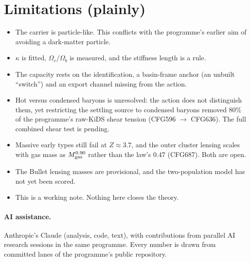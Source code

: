 \documentclass[10pt]{article}
\begin{document}
\section{Limitations (plainly)}
\begin{itemize}
\item The carrier is particle-like. This conflicts with the programme's earlier aim of avoiding a dark-matter particle.
\item $\kappa$ is fitted, $\Omega_c/\Omega_b$ is measured, and the stiffness length is a rule.
\item The capacity rests on the identification, a basin-frame anchor (an unbuilt ``switch'') and an export channel missing from the action.
\item Hot versus condensed baryons is unresolved: the action does not distinguish them, yet restricting the settling source to condensed baryons removed 80\% of the programme's raw-KiDS shear tension (CFG596 $\to$ CFG636). The full combined shear test is pending.
\item Massive early types still fail at $Z\approx3.7$, and the outer cluster lensing scales with gas mass as $M_{\rm gas}^{0.90}$ rather than the law's $0.47$ (CFG687). Both are open.
\item The Bullet lensing masses are provisional, and the two-population model has not yet been scored.
\item This is a working note. Nothing here closes the theory.
\end{itemize}

\paragraph{AI assistance.} Anthropic's Claude (analysis, code, text), with contributions from parallel AI research sessions in the same programme. Every number is drawn from committed lanes of the programme's public repository.
\end{document}
